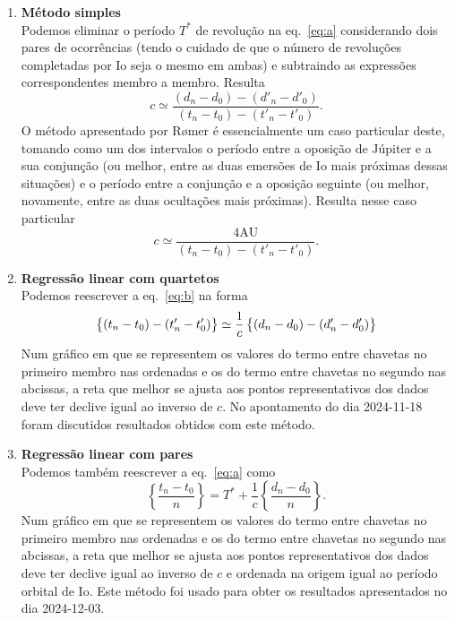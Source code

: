 \documentclass[]{article}
\begin{document}
\begin{enumerate}
  \item \textbf{Método simples}\\
    Podemos eliminar o período $T^*$ de revolução na eq.~\eqref{eq:a}
    considerando dois pares de ocorrên\-cias (tendo o cuidado de que o número de
    revoluções completadas por Io seja o mesmo em ambas) e subtraindo as
    expressões correspondentes membro a membro. Resulta
    \begin{equation}\label{eq:b}
      c\simeq\frac{(d_n-d_0)-(d'_n-d'_0)}{(t_n-t_0)-(t'_n-t'_0)}.
    \end{equation}
    O método apresentado por R{\o}mer é essencialmente um caso particular deste,
    tomando como um dos intervalos o período entre a oposição de Júpiter e a sua
    conjunção (ou melhor, entre as duas emersões de Io mais próximas dessas
    situações) e o período entre a conjunção e a oposição seguinte (ou melhor,
    novamente, entre as duas ocultações mais próximas). Resulta
    nesse caso particular
    \begin{equation*}
      c\simeq\frac{4\text{AU}}{(t_n-t_0)-(t'_n-t'_0)}.
    \end{equation*}
  \item \textbf{Regressão linear com quartetos}\\
    Podemos reescrever a eq.~\eqref{eq:b} na forma
    \begin{equation*}
      \left\{(\strut t_n-t_0)-(t'_n-t'_0)\right\}\simeq\frac{1}{c}
      \left\{(d_n-d_0)-(d'_n-d'_0)\strut\right\}
    \end{equation*}
    Num gráfico em que se representem os valores do termo entre chavetas no
    primeiro membro nas ordenadas e os do termo entre chavetas no segundo nas
    abcissas, a reta que melhor se ajusta aos pontos representativos dos dados
    deve ter declive igual ao inverso de $c$. No apontamento do dia 2024-11-18
    foram discutidos resultados obtidos com este método.

  \item \textbf{Regressão linear com pares}\\
    Podemos também reescrever a eq.~\eqref{eq:a} como
    \begin{equation}
      \left\{\frac{t_n-t_0}{n}\right\}
        =T^*+\frac{1}{c}\left\{\frac{d_n-d_0}{n}\right\}.
    \end{equation}
    Num gráfico em que se representem os valores do termo entre chavetas no
    primeiro membro nas ordenadas e os do termo entre chavetas no segundo nas
    abcissas, a reta que melhor se ajusta aos pontos representativos dos dados
    deve ter declive igual ao inverso de $c$ e ordenada na origem igual ao
    período orbital de Io. Este método foi usado para obter os resultados
    apresentados no dia 2024-12-03.
\end{enumerate}
\end{document}
